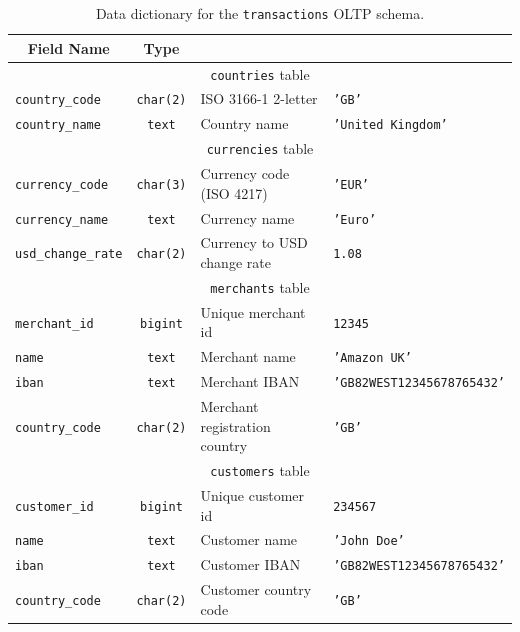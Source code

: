 \documentclass[11pt,a4paper,computermodern]{article}
\newcommand{\code}{\texttt}
\begin{document}
\begin{table}[!htb]
	\centering
	\begin{threeparttable}
		\caption{Data dictionary for the \code{transactions} OLTP schema.}
		\label{table:ReferenceDataDict}
		\begin{tabularx}{0.99\textwidth}{l c >{\arraybackslash}X >{\arraybackslash}X}
			\toprule
			\multicolumn{1}{c}{\textbf{Field Name}} & \multicolumn{1}{c}{\textbf{Type}} & \multicolumn{1}{c}{\textbf{Description}} & \multicolumn{1}{c}{\textbf{Example}} \\
			\midrule
			\multicolumn{4}{c}{\code{countries} table}\\
			\code{country\_code} & \code{char(2)} & ISO 3166-1 2-letter & \code{'GB'} \\
			\code{country\_name} & \code{text} & Country name & \code{'United Kingdom'} \\
			
			\midrule
			\multicolumn{4}{c}{\code{currencies} table}\\
			\code{currency\_code} & \code{char(3)} & Currency code (ISO 4217) & \code{'EUR'} \\
			\code{currency\_name} & \code{text} & Currency name & \code{'Euro'} \\
			\code{usd\_change\_rate} & \code{char(2)} & Currency to USD change rate & \code{1.08} \\
			
			\midrule
			\multicolumn{4}{c}{\code{merchants} table}\\
			\code{merchant\_id} & \code{bigint} & Unique merchant id & \code{12345} \\
			\code{name} & \code{text} & Merchant name & \code{'Amazon UK'} \\
			\code{iban} & \code{text} & Merchant IBAN & \code{'GB82WEST12345678765432'} \\
			\code{country\_code} & \code{char(2)} & Merchant registration country & \code{'GB'} \\
			
			\midrule
			\multicolumn{4}{c}{\code{customers} table}\\
			\code{customer\_id} & \code{bigint} & Unique customer id & \code{234567} \\
			\code{name} & \code{text} & Customer name & \code{'John Doe'} \\
			\code{iban} & \code{text} & Customer IBAN & \code{'GB82WEST12345678765432'} \\
			\code{country\_code} & \code{char(2)} & Customer country code  & \code{'GB'} \\
			
			\bottomrule
		\end{tabularx}
	\end{threeparttable}
\end{table}
\end{document}
